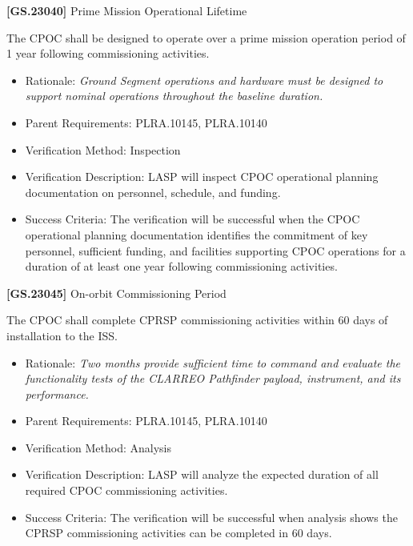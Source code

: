 \textbf{[GS.23040]} Prime Mission Operational Lifetime

The \gls{CPOC} shall be designed to operate over a prime mission operation period of 1 year following commissioning activities.

\begin{itemize}
\item{} Rationale: \emph{Ground Segment operations and hardware must be designed to support nominal operations throughout the baseline duration.}

\item{} Parent Requirements: PLRA.10145, PLRA.10140

\item{} Verification Method: Inspection

\item{} Verification Description: \gls{LASP} will inspect \gls{CPOC} operational planning documentation on personnel, schedule, and funding.

\item{} Success Criteria: The verification will be successful when the \gls{CPOC} operational planning documentation identifies the commitment of key personnel, sufficient funding, and facilities supporting \gls{CPOC} operations for a duration of at least one year following commissioning activities.

\end{itemize}

\textbf{[GS.23045]} On-orbit Commissioning Period

The \gls{CPOC} shall complete \gls{CPRSP} commissioning activities within 60 days of installation to the \gls{ISS}.

\begin{itemize}
\item{} Rationale: \emph{Two months provide sufficient time to command and evaluate the functionality tests of the CLARREO Pathfinder payload, instrument, and its performance.}

\item{} Parent Requirements: PLRA.10145, PLRA.10140

\item{} Verification Method: Analysis

\item{} Verification Description: \gls{LASP} will analyze the expected duration of all required \gls{CPOC} commissioning activities.

\item{} Success Criteria: The verification will be successful when \gls{analysis} shows the \gls{CPRSP} commissioning activities can be completed in 60 days.

\end{itemize}

